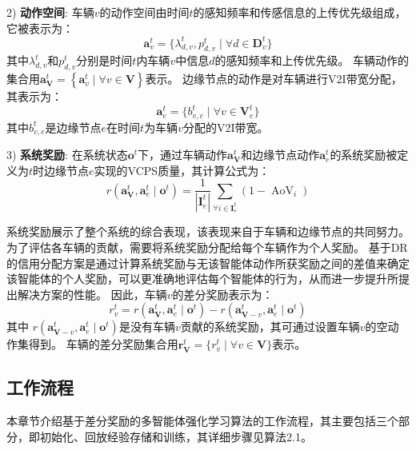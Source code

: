 2) \textbf{动作空间}: 车辆$v$的动作空间由时间$t$的感知频率和传感信息的上传优先级组成，它被表示为：
	\begin{equation}
		\boldsymbol{a}_{v}^{t}=\{ \lambda_{d, v}^{t}, p_{d, v}^{t} \mid \forall d \in \mathbf{D}_{v}^t\}
	\end{equation}
	\noindent 其中$\lambda_{d, v}^{t}$和$p_{d, v}^{t}$分别是时间$t$内车辆$v$中信息$d$的感知频率和上传优先级。
	车辆动作的集合用$\boldsymbol{a}_{\mathbf{V}}^{t} = \left\{\boldsymbol{a}_{v}^{t}\mid \forall v \in \mathbf{V}\right\}$表示。
	边缘节点的动作是对车辆进行V2I带宽分配，其表示为：
	\begin{equation}
		\boldsymbol{a}_{e}^{t}=\{b_{v, e}^{t} \mid \forall v \in \mathbf{V}_{e}^{t}\}
	\end{equation}
	其中$b_{v, e}^t$是边缘节点$e$在时间$t$为车辆$v$分配的V2I带宽。
	
3) \textbf{系统奖励}: 在系统状态$\boldsymbol{o}^{t}$下，通过车辆动作$\boldsymbol{a}_{\mathbf{V}}^{t}$和边缘节点动作$\boldsymbol{a}_{e}^{t}$的系统奖励被定义为$t$时边缘节点$e$实现的VCPS质量，其计算公式为：
	\begin{equation}
		r\left(\boldsymbol{a}_{\mathbf{V}}^{t},\boldsymbol{a}_{e}^{t} \mid \boldsymbol{o}^{t}\right)=\frac{1}{\left|\mathbf{I}_e^t\right|} \sum_{\forall i \in \mathbf{I}_e^t}\left(1 -\operatorname{AoV}_{i} \right)
	\end{equation}
	
系统奖励展示了整个系统的综合表现，该表现来自于车辆和边缘节点的共同努力。
为了评估各车辆的贡献，需要将系统奖励分配给每个车辆作为个人奖励。
基于DR的信用分配方案是通过计算系统奖励与无该智能体动作所获奖励之间的差值来确定该智能体的个人奖励，可以更准确地评估每个智能体的行为，从而进一步提升所提出解决方案的性能。
因此，车辆$v$的差分奖励表示为：
\begin{equation}
r_{v}^{t}=r\left(\boldsymbol{a}_{\mathbf{V}}^{t},\boldsymbol{a}_{e}^{t} \mid \boldsymbol{o}^{t}\right)-r\left(\boldsymbol{a}_{\mathbf{V}-v}^{t},\boldsymbol{a}_{e}^{t} \mid \boldsymbol{o}^{t}\right)
\end{equation}
\noindent 其中 $r\left(\boldsymbol{a}_{\mathbf{V}-v}^{t},\boldsymbol{a}_{e}^{t} \mid \boldsymbol{o}^{t}\right)$是没有车辆$v$贡献的系统奖励，其可通过设置车辆$v$的空动作集得到。
车辆的差分奖励集合用$\boldsymbol{r}_{\mathbf{V}}^{t}=\{ r_{v}^{t} \mid \forall v \in \mathbf{V}\}$表示。

\subsection{工作流程}
本章节介绍基于差分奖励的多智能体强化学习算法的工作流程，其主要包括三个部分，即初始化、回放经验存储和训练，其详细步骤见算法2.1。

